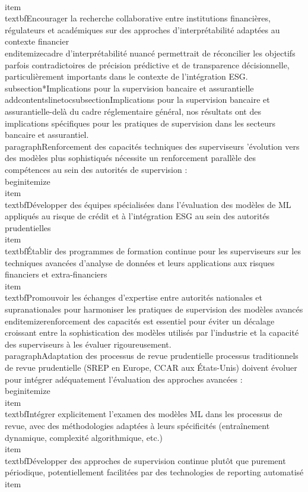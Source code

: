   \n    \\item \\textbf{Encourager la recherche collaborative} entre institutions financières, régulateurs et académiques sur des approches d'interprétabilité adaptées au contexte financier\n\\end{itemize}\n\nUn cadre d'interprétabilité nuancé permettrait de réconcilier les objectifs parfois contradictoires de précision prédictive et de transparence décisionnelle, particulièrement importants dans le contexte de l'intégration ESG.\n\n\\subsection*{Implications pour la supervision bancaire et assurantielle}\n\\addcontentsline{toc}{subsection}{Implications pour la supervision bancaire et assurantielle}\n\nAu-delà du cadre réglementaire général, nos résultats ont des implications spécifiques pour les pratiques de supervision dans les secteurs bancaire et assurantiel.\n\n\\paragraph{Renforcement des capacités techniques des superviseurs} \n\nL'évolution vers des modèles plus sophistiqués nécessite un renforcement parallèle des compétences au sein des autorités de supervision :\n\n\\begin{itemize}\n    \\item \\textbf{Développer des équipes spécialisées} dans l'évaluation des modèles de ML appliqués au risque de crédit et à l'intégration ESG au sein des autorités prudentielles\n    \n    \\item \\textbf{Établir des programmes de formation continue} pour les superviseurs sur les techniques avancées d'analyse de données et leurs applications aux risques financiers et extra-financiers\n    \n    \\item \\textbf{Promouvoir les échanges d'expertise} entre autorités nationales et supranationales pour harmoniser les pratiques de supervision des modèles avancés\n\\end{itemize}\n\nCe renforcement des capacités est essentiel pour éviter un décalage croissant entre la sophistication des modèles utilisés par l'industrie et la capacité des superviseurs à les évaluer rigoureusement.\n\n\\paragraph{Adaptation des processus de revue prudentielle} \n\nLes processus traditionnels de revue prudentielle (SREP en Europe, CCAR aux États-Unis) doivent évoluer pour intégrer adéquatement l'évaluation des approches avancées :\n\n\\begin{itemize}\n    \\item \\textbf{Intégrer explicitement l'examen des modèles ML} dans les processus de revue, avec des méthodologies adaptées à leurs spécificités (entraînement dynamique, complexité algorithmique, etc.)\n    \n    \\item \\textbf{Développer des approches de supervision continue} plutôt que purement périodique, potentiellement facilitées par des technologies de reporting automatisé\n    \n    \\item 